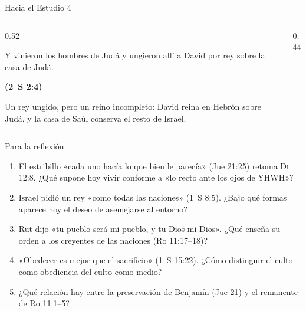 \documentclass[hyperref={bookmarks=false},aspectratio=169]{beamer}
\newcommand{\fuente}[1]{\par\hfill{\upshape\bfseries\footnotesize\textcolor{ladrillo}{#1}}}
\newcommand{\notafig}[1]{\par\vspace{2pt}{\fontsize{5}{6}\selectfont\color{sepia}\hfill\textit{Nota.} #1\par}}
\newcommand{\elabpropia}{\notafig{Elaboración propia.}}
\begin{document}
\begin{frame}{Hacia el Estudio 4}
\begin{columns}[c,onlytextwidth]
\begin{column}{0.52\textwidth}
\begin{cita}Y vinieron los hombres de Judá y ungieron allí a David por rey sobre la casa de Judá.\fuente{(2~S 2:4)}\end{cita}
\small Un rey ungido, pero un reino incompleto: David reina en Hebrón sobre Judá, y la casa de Saúl conserva el resto de Israel.
\end{column}
\begin{column}{0.44\textwidth}
\centering
{}
\elabpropia
\end{column}
\end{columns}
\end{frame}

\begin{frame}{Para la reflexión}
\small
\begin{enumerate}
\item El estribillo «cada uno hacía lo que bien le parecía» (Jue 21:25) retoma Dt 12:8. ¿Qué supone hoy vivir conforme a «lo recto ante los ojos de YHWH»?
\item Israel pidió un rey «como todas las naciones» (1~S 8:5). ¿Bajo qué formas aparece hoy el deseo de asemejarse al entorno?
\item Rut dijo «tu pueblo será mi pueblo, y tu Dios mi Dios». ¿Qué enseña su orden a los creyentes de las naciones (Ro 11:17--18)?
\item «Obedecer es mejor que el sacrificio» (1~S 15:22). ¿Cómo distinguir el culto como obediencia del culto como medio?
\item ¿Qué relación hay entre la preservación de Benjamín (Jue 21) y el remanente de Ro 11:1--5?
\end{enumerate}
\end{frame}
\end{document}
